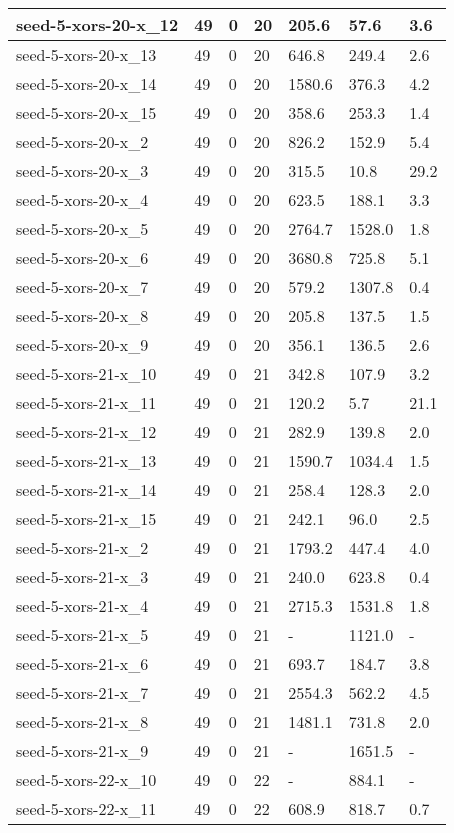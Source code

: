 \begin{scriptsize}
\begin{longtable}{|p{5cm}|l|l|l|l|l|l|}
seed-5-xors-20-x\_12&49&0&20&205.6&57.6&3.6 \\ \hline 
seed-5-xors-20-x\_13&49&0&20&646.8&249.4&2.6 \\ \hline 
seed-5-xors-20-x\_14&49&0&20&1580.6&376.3&4.2 \\ \hline 
seed-5-xors-20-x\_15&49&0&20&358.6&253.3&1.4 \\ \hline 
seed-5-xors-20-x\_2&49&0&20&826.2&152.9&5.4 \\ \hline 
seed-5-xors-20-x\_3&49&0&20&315.5&10.8&29.2 \\ \hline 
seed-5-xors-20-x\_4&49&0&20&623.5&188.1&3.3 \\ \hline 
seed-5-xors-20-x\_5&49&0&20&2764.7&1528.0&1.8 \\ \hline 
seed-5-xors-20-x\_6&49&0&20&3680.8&725.8&5.1 \\ \hline 
seed-5-xors-20-x\_7&49&0&20&579.2&1307.8&0.4 \\ \hline 
seed-5-xors-20-x\_8&49&0&20&205.8&137.5&1.5 \\ \hline 
seed-5-xors-20-x\_9&49&0&20&356.1&136.5&2.6 \\ \hline 
seed-5-xors-21-x\_10&49&0&21&342.8&107.9&3.2 \\ \hline 
seed-5-xors-21-x\_11&49&0&21&120.2&5.7&21.1 \\ \hline 
seed-5-xors-21-x\_12&49&0&21&282.9&139.8&2.0 \\ \hline 
seed-5-xors-21-x\_13&49&0&21&1590.7&1034.4&1.5 \\ \hline 
seed-5-xors-21-x\_14&49&0&21&258.4&128.3&2.0 \\ \hline 
seed-5-xors-21-x\_15&49&0&21&242.1&96.0&2.5 \\ \hline 
seed-5-xors-21-x\_2&49&0&21&1793.2&447.4&4.0 \\ \hline 
seed-5-xors-21-x\_3&49&0&21&240.0&623.8&0.4 \\ \hline 
seed-5-xors-21-x\_4&49&0&21&2715.3&1531.8&1.8 \\ \hline 
seed-5-xors-21-x\_5&49&0&21&-&1121.0&- \\ \hline 
seed-5-xors-21-x\_6&49&0&21&693.7&184.7&3.8 \\ \hline 
seed-5-xors-21-x\_7&49&0&21&2554.3&562.2&4.5 \\ \hline 
seed-5-xors-21-x\_8&49&0&21&1481.1&731.8&2.0 \\ \hline 
seed-5-xors-21-x\_9&49&0&21&-&1651.5&- \\ \hline 
seed-5-xors-22-x\_10&49&0&22&-&884.1&- \\ \hline 
seed-5-xors-22-x\_11&49&0&22&608.9&818.7&0.7 \\ \hline 

\end{longtable}
\end{scriptsize}
